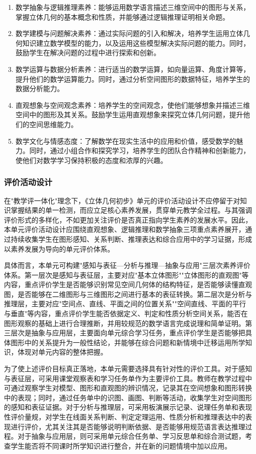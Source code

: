 \documentclass[UTF8,a4paper,12pt,twoside]{ctexart}
\begin{document}
\begin{enumerate}
\item 数学抽象与逻辑推理素养：能够运用数学语言描述三维空间中的图形与关系，掌握立体几何的基本概念和性质，并能够通过逻辑推理证明相关命题。
\item 数学建模与问题解决素养：通过实际问题的引入和解决，培养学生运用立体几何知识建立数学模型的能力，以及运用这些模型解决实际问题的能力。同时，鼓励学生在解决问题的过程中进行探索和创新。
\item 数学运算与数据分析素养：进行适当的数学运算，如向量运算、角度计算等，提升他们的数学运算能力。同时，通过分析空间图形的数据特征，培养学生的数据分析能力。
\item 直观想象与空间观念素养：培养学生的空间观念，使他们能够想象并描述三维空间中的图形及其关系。鼓励学生运用直观想象来探究立体几何问题，提升他们的空间思维能力。
\item 数学文化与情感态度：了解数学在现实生活中的应用和价值，感受数学的魅力。同时，通过小组合作和探究学习，培养学生的团队合作精神和创新能力，使他们对数学学习保持积极的态度和浓厚的兴趣。
\end{enumerate}

\subsubsection{评价活动设计}

在"教学评一体化"理念下，《立体几何初步》单元的评价活动设计不应停留于对知识掌握结果的单一检测，而应立足核心素养发展，贯穿单元教学全过程。与其强调评价形式的多样化，不如更加关注评价是否真正指向学生素养的发展水平。因此，本单元评价活动设计应围绕直观想象、逻辑推理和数学抽象三项重点素养展开，通过持续收集学生在图形感知、关系判断、推理表达和综合应用中的学习证据，形成以素养发展为导向的单元评价体系。

具体而言，本单元可构建"感知与表征—分析与推理—抽象与应用"三层次素养评价体系。第一层次是感知与表征层，主要对应"基本立体图形""立体图形的直观图"等内容，重点评价学生是否能够识别常见空间几何体的结构特征，是否能够读懂直观图，是否能够在二维图形与三维图形之间进行基本的表征转换。第二层次是分析与推理层，主要对应"空间点、直线、平面之间的位置关系""空间直线、平面的平行与垂直"等内容，重点评价学生能否依据定义、判定和性质分析空间关系，能否在图形观察的基础上进行合理推断，并用较规范的数学语言完成说理和简单证明。第三层次是抽象与应用层，主要面向单元综合学习任务，重点评价学生是否能够把具体图形中的关系提升为一般性结论，并能够在综合问题和新情境中迁移运用所学知识，体现对单元内容的整体把握。

为了使上述评价目标真正落地，本单元需要选择具有针对性的评价工具。对于感知与表征层，可采用课堂观察表和学习任务单作为主要评价工具。教师在教学过程中可通过观察学生对模型、图形和直观图的辨识情况，记录其在空间想象和图形转换中的表现；同时，通过任务单中的识图、画图、判断等活动，收集学生对空间图形的感知和表征证据。对于分析与推理层，可采用板演展示记录、说理任务单和表现性评价量规，对学生在线面关系判断、判定定理运用、性质分析和推理表达中的表现进行评价，尤其关注其是否能够说明判断依据、是否能够用规范语言表达推理过程。对于抽象与应用层，则可采用单元综合任务单、学习反思单和综合测试题，考查学生能否将不同课时所学知识进行整合，并在新的问题情境中加以应用。
\end{document}
